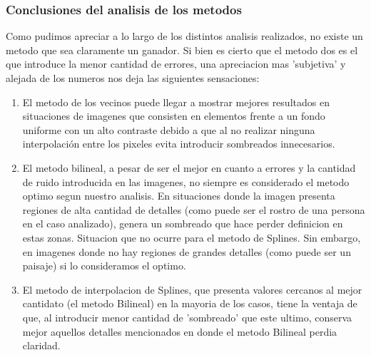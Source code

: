 \subsubsection{Conclusiones del analisis de los metodos}
Como pudimos apreciar a lo largo de los distintos analisis realizados, no existe un metodo que sea claramente un ganador.
Si bien es cierto que el metodo dos es el que introduce la menor cantidad de errores, una apreciacion mas 'subjetiva' y alejada de los numeros nos deja las siguientes sensaciones:
\begin{enumerate}
 \item El metodo de los vecinos puede llegar a mostrar mejores resultados en situaciones de imagenes que consisten en elementos frente a un fondo uniforme con un alto contraste debido a que al no realizar ninguna interpolación entre los pixeles evita introducir sombreados innecesarios.
 \item El metodo bilineal, a pesar de ser el mejor en cuanto a errores y la cantidad de ruido introducida en las imagenes, no siempre es considerado el metodo optimo segun nuestro analisis. En situaciones donde la imagen presenta regiones de alta cantidad de detalles (como puede ser el rostro de una persona en el caso analizado), genera un sombreado que hace perder definicion en estas zonas. Situacion que no ocurre para el metodo de Splines. Sin embargo, en imagenes donde no hay regiones de grandes detalles (como puede ser un paisaje) si lo consideramos el optimo.
 \item El metodo de interpolacion de Splines, que presenta valores cercanos al mejor cantidato (el metodo Bilineal) en la mayoria de los casos, tiene la ventaja de que, al introducir menor cantidad de 'sombreado' que este ultimo, conserva mejor aquellos detalles mencionados en donde el metodo Bilineal perdia claridad.
\end{enumerate}




